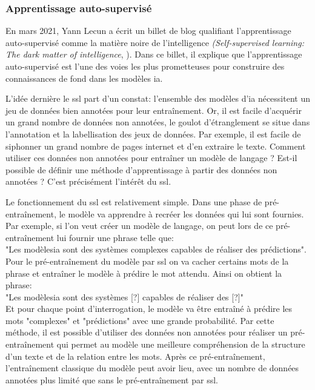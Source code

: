 \subsubsection{Apprentissage auto-supervisé}
En mars 2021, Yann Lecun a écrit un billet de blog qualifiant l'apprentissage auto-supervisé comme la matière noire de l'intelligence \textit{(Self-supervised learning: The dark matter of intelligence}, \cite{lecun_self-supervised_2021}). Dans ce billet, il explique que l'apprentissage auto-supervisé est l'une des voies les plus prometteuses pour construire des connaissances de fond dans les modèles \gls{ia}.


L'idée dernière le \gls{ssl} part d'un constat: l'ensemble des modèles d'\gls{ia} nécessitent un jeu de données bien annotées pour leur entraînement. Or, il est facile d'acquérir un grand nombre de données non annotées, le goulot d'étranglement se situe dans l'annotation et la labellisation des jeux de données. Par exemple, il est facile de siphonner un grand nombre de pages internet et d'en extraire le texte. Comment utiliser ces données non annotées pour entraîner un modèle de langage ? Est-il possible de définir une méthode d'apprentissage à partir des données non annotées ? C'est précisément l'intérêt du \gls{ssl}.


Le fonctionnement du \gls{ssl} est relativement simple. Dans une phase de pré-entraînement, le modèle va apprendre à recréer les données qui lui sont fournies. Par exemple, si l'on veut créer un modèle de langage, on peut lors de ce pré-entraînement lui fournir une phrase telle que: \\
"Les modèles\gls{ia} sont des systèmes complexes capables de réaliser des prédictions". \\
Pour le pré-entraînement du modèle par \gls{ssl} on va cacher certains mots de la phrase et entraîner le modèle à prédire le mot attendu. Ainsi on obtient la phrase: \\
"Les modèles\gls{ia} sont des systèmes [?] capables de réaliser des [?]" \\
Et pour chaque point d'interrogation, le modèle va être entraîné à prédire les mots "complexes" et "prédictions" avec une grande probabilité. Par cette méthode, il est possible d'utiliser des données non annotées pour réaliser un pré-entraînement qui permet au modèle une meilleure compréhension de la structure d'un texte et de la relation entre les mots. Après ce pré-entraînement, l'entraînement classique du modèle peut avoir lieu, avec un nombre de données annotées plus limité que sans le pré-entraînement par \gls{ssl}.


